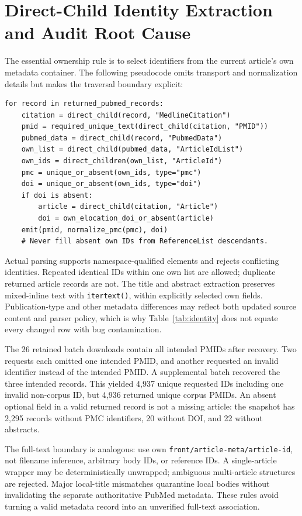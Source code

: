 \documentclass{article}
\begin{document}
\section{Direct-Child Identity Extraction and Audit Root Cause}
\label{app:parser}
The essential ownership rule is to select identifiers from the current article's own metadata container. The following pseudocode omits transport and normalization details but makes the traversal boundary explicit:
\begin{verbatim}
for record in returned_pubmed_records:
    citation = direct_child(record, "MedlineCitation")
    pmid = required_unique_text(direct_child(citation, "PMID"))
    pubmed_data = direct_child(record, "PubmedData")
    own_list = direct_child(pubmed_data, "ArticleIdList")
    own_ids = direct_children(own_list, "ArticleId")
    pmc = unique_or_absent(own_ids, type="pmc")
    doi = unique_or_absent(own_ids, type="doi")
    if doi is absent:
        article = direct_child(citation, "Article")
        doi = own_elocation_doi_or_absent(article)
    emit(pmid, normalize_pmc(pmc), doi)
    # Never fill absent own IDs from ReferenceList descendants.
\end{verbatim}
Actual parsing supports namespace-qualified elements and rejects conflicting identities. Repeated identical IDs within one own list are allowed; duplicate returned article records are not. The title and abstract extraction preserves mixed-inline text with \texttt{itertext()}, within explicitly selected own fields. Publication-type and other metadata differences may reflect both updated source content and parser policy, which is why Table~\ref{tab:identity} does not equate every changed row with bug contamination.

The 26 retained batch downloads contain all intended PMIDs after recovery. Two requests each omitted one intended PMID, and another requested an invalid identifier instead of the intended PMID. A supplemental batch recovered the three intended records. This yielded 4,937 unique requested IDs including one invalid non-corpus ID, but 4,936 returned unique corpus PMIDs. An absent optional field in a valid returned record is not a missing article: the snapshot has 2,295 records without PMC identifiers, 20 without DOI, and 22 without abstracts.

The full-text boundary is analogous: use own \texttt{front/article-meta/article-id}, not filename inference, arbitrary body IDs, or reference IDs. A single-article wrapper may be deterministically unwrapped; ambiguous multi-article structures are rejected. Major local-title mismatches quarantine local bodies without invalidating the separate authoritative PubMed metadata. These rules avoid turning a valid metadata record into an unverified full-text association.
\end{document}
